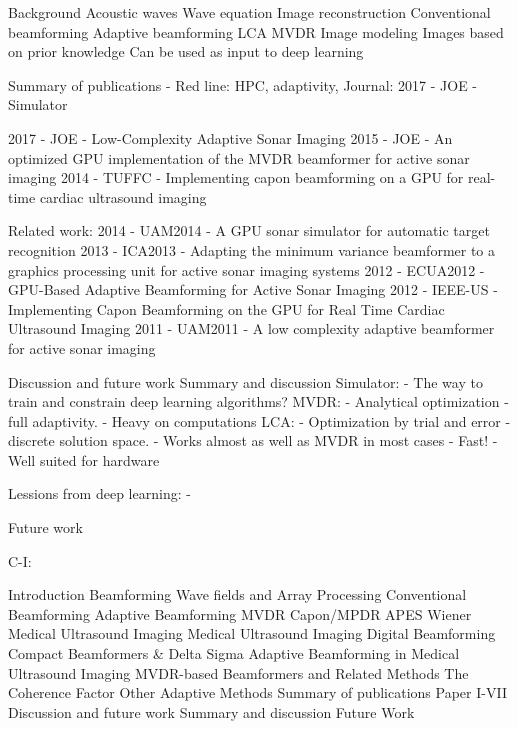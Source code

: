       
Background
   Acoustic waves
      Wave equation
   Image reconstruction
      Conventional beamforming
      Adaptive beamforming
         LCA
         MVDR
   Image modeling
      Images based on prior knowledge
      Can be used as input to deep learning
      

Summary of publications
   - Red line: HPC, adaptivity,
   Journal:
      2017 - JOE - Simulator
               
      2017 - JOE - Low-Complexity Adaptive Sonar Imaging
      2015 - JOE - An optimized GPU implementation of the MVDR beamformer for active sonar imaging
      2014 - TUFFC - Implementing capon beamforming on a GPU for real-time cardiac ultrasound imaging 
      
   Related work:
      2014 - UAM2014 - A GPU sonar simulator for automatic target recognition
      2013 - ICA2013 - Adapting the minimum variance beamformer to a graphics processing unit for active sonar imaging systems
      2012 - ECUA2012 - GPU-Based Adaptive Beamforming for Active Sonar Imaging
      2012 - IEEE-US - Implementing Capon Beamforming on the GPU for Real Time Cardiac Ultrasound Imaging
      2011 - UAM2011 - A low complexity adaptive beamformer for active sonar imaging

Discussion and future work
   Summary and discussion
      Simulator:
      - The way to train and constrain deep learning algorithms?
      MVDR:
      - Analytical optimization - full adaptivity.
      - Heavy on computations
      LCA:
      - Optimization by trial and error - discrete solution space.
      - Works almost as well as MVDR in most cases
      - Fast!
      - Well suited for hardware
      
      Lessions from deep learning:
      - 
      
   Future work
   


C-I:

Introduction
   Beamforming
   Wave fields and Array Processing
   Conventional Beamforming
   Adaptive Beamforming
      MVDR
      Capon/MPDR
      APES
      Wiener
   Medical Ultrasound Imaging
   Medical Ultrasound Imaging
   Digital Beamforming
      Compact Beamformers \& Delta Sigma
      Adaptive Beamforming in Medical Ultrasound Imaging
         MVDR-based Beamformers and Related Methods
         The Coherence Factor
         Other Adaptive Methods
Summary of publications
   Paper I-VII
Discussion and future work
   Summary and discussion
   Future Work

